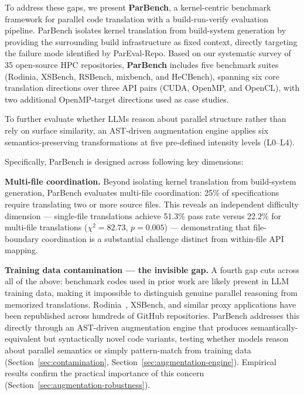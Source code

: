 \documentclass{article}
\begin{document}
To address these gaps, we present \textbf{ParBench}, a kernel-centric benchmark framework for parallel code translation with a build-run-verify evaluation pipeline. ParBench isolates kernel translation from build-system generation by providing the surrounding build infrastructure as fixed context, directly targeting the failure mode identified by ParEval-Repo. Based on our systematic survey of 35 open-source HPC repositories, \textbf{ParBench} includes five benchmark suites (Rodinia, XSBench, RSBench, mixbench, and HeCBench), spanning six core translation directions over three API pairs (CUDA, OpenMP, and OpenCL), with two additional OpenMP-target directions used as case studies. 

To further evaluate whether LLMs reason about parallel structure rather than rely on surface similarity, an AST-driven augmentation engine applies six semantics-preserving transformations at five pre-defined intensity levels (L0--L4).

Specifically, ParBench is designed across following key dimensions:

\textbf{Multi-file coordination.} Beyond isolating kernel translation from build-system generation, ParBench evaluates multi-file coordination: 25\% of specifications require translating two or more source files. This reveals an independent difficulty dimension --- single-file translations achieve 51.3\% pass rate versus 22.2\% for multi-file translations ($\chi^2 = 82.73$, $p = 0.005$) --- demonstrating that file-boundary coordination is a substantial challenge distinct from within-file API mapping.

\textbf{Training data contamination --- the invisible gap.} A fourth gap cuts across all of the above: benchmark codes used in prior work are likely present in LLM training data, making it impossible to distinguish genuine parallel reasoning from memorized translations. Rodinia~\cite{Rodinia2009}, XSBench, and similar proxy applications have been republished across hundreds of GitHub repositories. ParBench addresses this directly through an AST-driven augmentation engine that produces semantically-equivalent but syntactically novel code variants, testing whether models reason about parallel semantics or simply pattern-match from training data (Section~\ref{sec:contamination}, Section~\ref{sec:augmentation-engine}). Empirical results confirm the practical importance of this concern (Section~\ref{sec:augmentation-robustness}).
\end{document}
